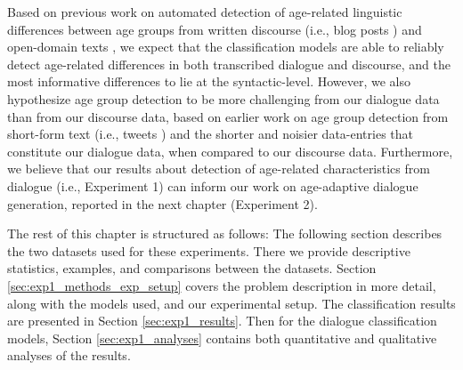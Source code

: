 Based on previous work on automated detection of age-related linguistic differences between age groups from written discourse (i.e., blog posts \citep{schler2006effects}) and open-domain texts \citep{abdallah2020age}, we expect that the classification models are able to reliably detect age-related differences in both transcribed dialogue and discourse, and the most informative differences to lie at the syntactic-level. However, we also hypothesize age group detection to be more challenging from our dialogue data than from our discourse data, based on earlier work on age group detection from short-form text (i.e., tweets \citep{nguyen2014gender}) and the shorter and noisier data-entries that constitute our dialogue data, when compared to our discourse data. Furthermore, we believe that our results about detection of age-related characteristics from dialogue (i.e., Experiment 1) can inform our work on age-adaptive dialogue generation, reported in the next chapter (Experiment 2).


The rest of this chapter is structured as follows: The following section describes the two datasets used for these experiments. There we provide descriptive statistics, examples, and comparisons between the datasets. Section \ref{sec:exp1_methods_exp_setup} covers the problem description in more detail, along with the models used, and our experimental setup. The classification results are presented in Section \ref{sec:exp1_results}. Then for the dialogue classification models, Section \ref{sec:exp1_analyses} contains both quantitative and qualitative analyses of the results.

